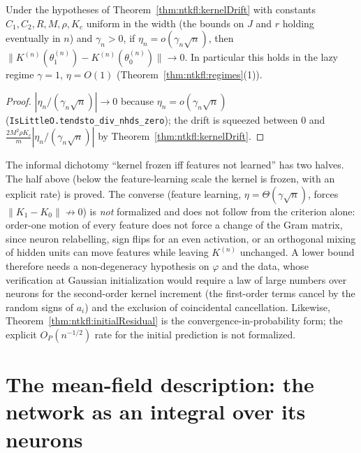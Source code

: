 \begin{theorem}\label{thm:ntkfl:freeze}
  \leanok
Under the hypotheses of Theorem~\ref{thm:ntkfl:kernelDrift} with constants $C_1,C_2,R,M,\rho,K_c$ uniform in the width (the bounds on $J$ and $r$ holding eventually in $n$) and $\gamma_n>0$, if
$\eta_n=o(\gamma_n\sqrt n)$, then $\|K^{(n)}(\theta_1^{(n)})-K^{(n)}(\theta_0^{(n)})\|\to0$. In particular this holds in the lazy regime $\gamma=1$, $\eta=O(1)$ (Theorem~\ref{thm:ntkfl:regimes}(1)).
\end{theorem}

\begin{proof}
  \leanok
$|\eta_n/(\gamma_n\sqrt n)|\to0$ because $\eta_n=o(\gamma_n\sqrt n)$ (\texttt{IsLittleO.tendsto\_div\_nhds\_zero}); the drift is squeezed between $0$ and $\frac{2M^2\rho K_c}{m}|\eta_n/(\gamma_n\sqrt n)|$ by Theorem~\ref{thm:ntkfl:kernelDrift}.
\end{proof}

\begin{remark}\label{rmk:ntkfl:noConverse}
The informal dichotomy ``kernel frozen iff features not learned'' has two halves. The half above (below the feature-learning scale the kernel is frozen, with an explicit rate) is proved. The converse (feature learning, $\eta=\Theta(\gamma\sqrt n)$, forces $\|K_1-K_0\|\not\to0$) is \emph{not} formalized and does not follow from the criterion alone: order-one motion of every feature does not force a change of the Gram matrix, since neuron relabelling, sign flips for an even activation, or an orthogonal mixing of hidden units can move features while leaving $K^{(n)}$ unchanged. A lower bound therefore needs a non-degeneracy hypothesis on $\varphi$ and the data, whose verification at Gaussian initialization would require a law of large numbers over neurons for the second-order kernel increment (the first-order terms cancel by the random signs of $a_i$) and the exclusion of coincidental cancellation. Likewise, Theorem~\ref{thm:ntkfl:initialResidual} is the convergence-in-probability form; the explicit $O_P(n^{-1/2})$ rate for the initial prediction is not formalized.
\end{remark}


\section{The mean-field description: the network as an integral over its neurons}\label{sec:ntkfl:meanfield}

